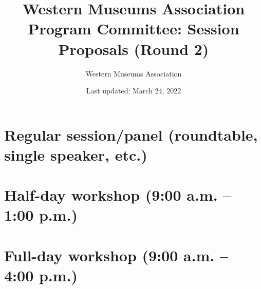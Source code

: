 \documentclass{report}
\title{ Western Museums Association Program Committee: Session Proposals (Round 2)}
\date{ Last updated: March 24, 2022}
\author{Western Museums Association}
\begin{document}
  \maketitle
  \newpage
  \tableofcontents
  \newpage
  
    \newpage
    \chapter*{ Regular session/panel (roundtable, single speaker, etc.) }

      
        
        
        
        
        
        
    \newpage
    \chapter*{ Half-day workshop (9:00 a.m. – 1:00 p.m.) }

      
        
        
    \newpage
    \chapter*{ Full-day workshop (9:00 a.m. – 4:00 p.m.) }

      
        
        
        
\end{document}

